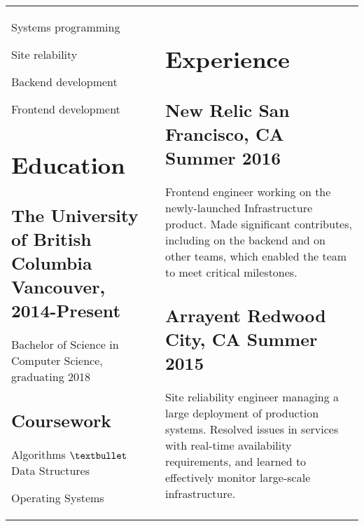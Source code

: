 \documentclass[letterpaper]{article}
\newlength{\leftcol}
\newlength{\rightcol}
\newcommand{\subtitle}{\normalfont\bodyfont\color{black}\large}
\begin{document}
\begin{tabularx}{\textwidth}{@{}p{\leftcol} p{\rightcol}}
Systems programming

Site relability

Backend development

Frontend development

\section*{Education}

\subsection*{The University of \newline British Columbia \newline\subtitle
  Vancouver, 2014-Present}

Bachelor of Science in Computer Science, graduating 2018

\subsection*{Coursework}

Algorithms $\textbullet$ Data Structures

Operating Systems

&
\raggedright

\vspace*{2pt}

\section*{Experience}


\subsection*{New Relic \subtitle \hfill San Francisco, CA Summer 2016}

Frontend engineer working on the newly-launched Infrastructure product. Made
significant contributes, including on the backend and on other teams, which
enabled the team to meet critical milestones.

\subsection*{Arrayent \subtitle \hfill Redwood City, CA Summer 2015}

Site reliability engineer managing a large deployment of production systems.
Resolved issues in services with real-time availability requirements, and
learned to effectively monitor large-scale infrastructure.


\end{tabularx}
\end{document}

